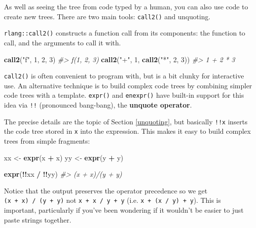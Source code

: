 \documentclass[]{book}
\newenvironment{Shaded}{\begin{snugshade}}{\end{snugshade}}
\newcommand{\CommentTok}[1]{\textcolor[rgb]{0.37,0.37,0.37}{\textit{#1}}}
\newcommand{\DecValTok}[1]{\textcolor[rgb]{0.06,0.06,0.06}{#1}}
\newcommand{\KeywordTok}[1]{\textcolor[rgb]{0.27,0.27,0.27}{\textbf{#1}}}
\newcommand{\NormalTok}[1]{#1}
\newcommand{\OperatorTok}[1]{\textcolor[rgb]{0.43,0.43,0.43}{\textbf{#1}}}
\newcommand{\StringTok}[1]{\textcolor[rgb]{0.5,0.5,0.5}{#1}}
\begin{document}
As well as seeing the tree from code typed by a human, you can also use code to create new trees. There are two main tools: \texttt{call2()} and unquoting.

\texttt{rlang::call2()} constructs a function call from its components: the function to call, and the arguments to call it with.

\begin{Shaded}
\begin{Highlighting}[]
\KeywordTok{call2}\NormalTok{(}\StringTok{"f"}\NormalTok{, }\DecValTok{1}\NormalTok{, }\DecValTok{2}\NormalTok{, }\DecValTok{3}\NormalTok{)}
\CommentTok{#> f(1, 2, 3)}
\KeywordTok{call2}\NormalTok{(}\StringTok{"+"}\NormalTok{, }\DecValTok{1}\NormalTok{, }\KeywordTok{call2}\NormalTok{(}\StringTok{"*"}\NormalTok{, }\DecValTok{2}\NormalTok{, }\DecValTok{3}\NormalTok{))}
\CommentTok{#> 1 + 2 * 3}
\end{Highlighting}
\end{Shaded}

\texttt{call2()} is often convenient to program with, but is a bit clunky for interactive use. An alternative technique is to build complex code trees by combining simpler code trees with a template. \texttt{expr()} and \texttt{enexpr()} have built-in support for this idea via \texttt{!!} (pronounced bang-bang), the \textbf{unquote operator}.

The precise details are the topic of Section \ref{unquoting}, but basically \texttt{!!x} inserts the code tree stored in \texttt{x} into the expression. This makes it easy to build complex trees from simple fragments:

\begin{Shaded}
\begin{Highlighting}[]
\NormalTok{xx <-}\StringTok{ }\KeywordTok{expr}\NormalTok{(x }\OperatorTok{+}\StringTok{ }\NormalTok{x)}
\NormalTok{yy <-}\StringTok{ }\KeywordTok{expr}\NormalTok{(y }\OperatorTok{+}\StringTok{ }\NormalTok{y)}

\KeywordTok{expr}\NormalTok{(}\OperatorTok{!!}\NormalTok{xx }\OperatorTok{/}\StringTok{ }\OperatorTok{!!}\NormalTok{yy)}
\CommentTok{#> (x + x)/(y + y)}
\end{Highlighting}
\end{Shaded}

Notice that the output preserves the operator precedence so we get \texttt{(x\ +\ x)\ /\ (y\ +\ y)} not \texttt{x\ +\ x\ /\ y\ +\ y} (i.e. \texttt{x\ +\ (x\ /\ y)\ +\ y}). This is important, particularly if you've been wondering if it wouldn't be easier to just paste strings together.
\end{document}
